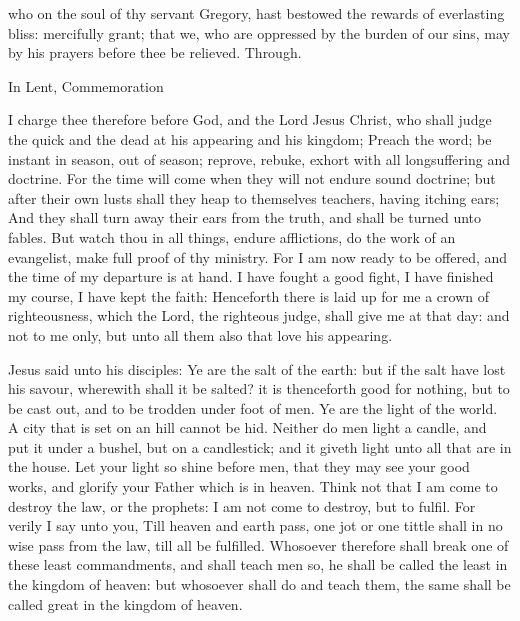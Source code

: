 \collect
{} who on the soul of thy servant Gregory, hast bestowed the rewards of everlasting bliss: mercifully grant; that we, who are oppressed by the burden of our sins, may by his prayers before thee be relieved. Through.
\begin{rubric}
    In Lent, Commemoration %
\end{rubric}

 I charge thee therefore before God, and the Lord Jesus Christ, who shall judge the quick and the dead at his appearing and his kingdom; Preach the word; be instant in season, out of season; reprove, rebuke, exhort with all longsuffering and doctrine. For the time will come when they will not endure sound doctrine; but after their own lusts shall they heap to themselves teachers, having itching ears; And they shall turn away their ears from the truth, and shall be turned unto fables. But watch thou in all things, endure afflictions, do the work of an evangelist, make full proof of thy ministry. For I am now ready to be offered, and the time of my departure is at hand. I have fought a good fight, I have finished my course, I have kept the faith: Henceforth there is laid up for me a crown of righteousness, which the Lord, the righteous judge, shall give me at that day: and not to me only, but unto all them also that love his appearing.


 Jesus said unto his disciples: Ye are the salt of the earth: but if the salt have lost his savour, wherewith shall it be salted? it is thenceforth good for nothing, but to be cast out, and to be trodden under foot of men. Ye are the light of the world. A city that is set on an hill cannot be hid. Neither do men light a candle, and put it under a bushel, but on a candlestick; and it giveth light unto all that are in the house. Let your light so shine before men, that they may see your good works, and glorify your Father which is in heaven. Think not that I am come to destroy the law, or the prophets: I am not come to destroy, but to fulfil. For verily I say unto you, Till heaven and earth pass, one jot or one tittle shall in no wise pass from the law, till all be fulfilled. Whosoever therefore shall break one of these least commandments, and shall teach men so, he shall be called the least in the kingdom of heaven: but whosoever shall do and teach them, the same shall be called great in the kingdom of heaven.

